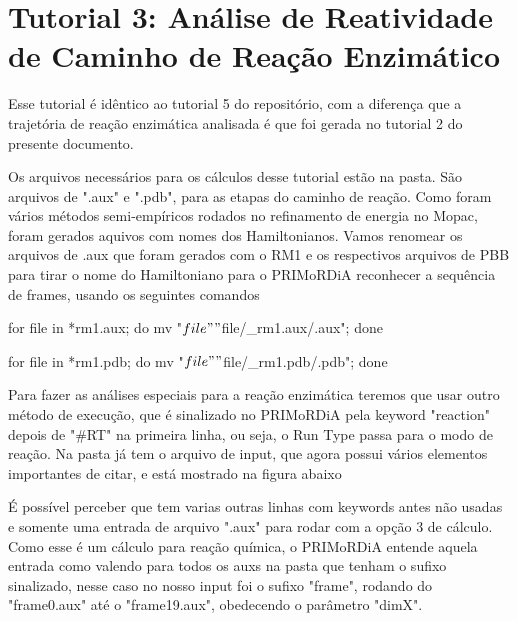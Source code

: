 \documentclass[a4paper,11pt]{refart}
\begin{document}
	
	
	\section{Tutorial 3: Análise de Reatividade de Caminho de Reação Enzimático}
	
	Esse tutorial é idêntico ao tutorial 5 do repositório, com a diferença que a trajetória de reação enzimática analisada é que foi gerada no tutorial 2 do presente documento.
		
	Os arquivos necessários para os cálculos desse tutorial estão na pasta. São arquivos de ".aux" e ".pdb", para as etapas do caminho de reação.  Como foram vários métodos semi-empíricos rodados no refinamento de energia no Mopac, foram gerados aquivos com nomes dos Hamiltonianos. Vamos renomear os arquivos de .aux que foram gerados com o RM1 e os respectivos arquivos de PBB para tirar o nome do Hamiltoniano para o PRIMoRDiA reconhecer a sequência de frames, usando os seguintes comandos
	
	\hspace*{-\leftmarginwidth}
	\begin{minipage}{\fullwidth}
		\begin{commandshell}for file in *rm1.aux; 
  do 
    mv "$file" "${file/_rm1.aux/.aux}";
done	\end{commandshell}
	\end{minipage}

	\hspace*{-\leftmarginwidth}
\begin{minipage}{\fullwidth}
	\begin{commandshell}for file in *rm1.pdb; 
  do 
    mv "$file" "${file/_rm1.pdb/.pdb}";
done\end{commandshell}
\end{minipage}
	 
	 
	Para fazer as análises especiais para a reação enzimática teremos que usar outro método de execução, que é sinalizado no PRIMoRDiA pela keyword "reaction" depois de "\#RT" na primeira linha, ou seja, o Run Type passa para o modo de reação. Na pasta já tem o arquivo de input, que agora possui vários elementos importantes de citar, e está mostrado na figura abaixo
	  
	É possível perceber que tem varias outras linhas com keywords antes não usadas e somente uma entrada de arquivo ".aux" para rodar com a opção 3 de cálculo. Como esse é um cálculo para reação química, o PRIMoRDiA entende aquela entrada como valendo para todos os auxs na pasta que tenham o sufixo sinalizado, nesse caso no nosso input foi o sufixo "frame", rodando do "frame0.aux" até o "frame19.aux", obedecendo o parâmetro "dimX".
	 
\end{document}
